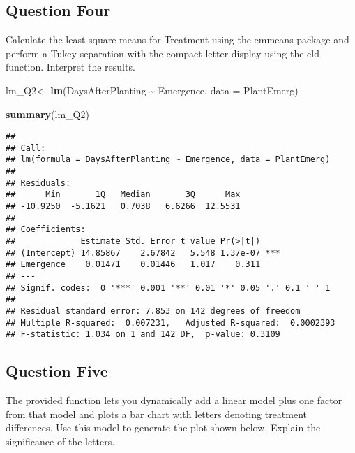 \documentclass[
  12pt,
]{article}
\newenvironment{Shaded}{\begin{snugshade}}{\end{snugshade}}
\newcommand{\AttributeTok}[1]{\textcolor[rgb]{0.13,0.29,0.53}{#1}}
\newcommand{\FunctionTok}[1]{\textcolor[rgb]{0.13,0.29,0.53}{\textbf{#1}}}
\newcommand{\NormalTok}[1]{#1}
\newcommand{\OtherTok}[1]{\textcolor[rgb]{0.56,0.35,0.01}{#1}}
\newcommand{\SpecialCharTok}[1]{\textcolor[rgb]{0.81,0.36,0.00}{\textbf{#1}}}
\begin{document}
\subsection{Question Four}\label{question-four}

Calculate the least square means for Treatment using the emmeans package
and perform a Tukey separation with the compact letter display using the
cld function. Interpret the results.

\begin{Shaded}
\begin{Highlighting}[]
\NormalTok{lm\_Q2}\OtherTok{\textless{}{-}} \FunctionTok{lm}\NormalTok{(DaysAfterPlanting }\SpecialCharTok{\textasciitilde{}}\NormalTok{ Emergence, }\AttributeTok{data =}\NormalTok{ PlantEmerg)}

\FunctionTok{summary}\NormalTok{(lm\_Q2)}
\end{Highlighting}
\end{Shaded}

\begin{verbatim}
## 
## Call:
## lm(formula = DaysAfterPlanting ~ Emergence, data = PlantEmerg)
## 
## Residuals:
##      Min       1Q   Median       3Q      Max 
## -10.9250  -5.1621   0.7038   6.6266  12.5531 
## 
## Coefficients:
##             Estimate Std. Error t value Pr(>|t|)    
## (Intercept) 14.85867    2.67842   5.548 1.37e-07 ***
## Emergence    0.01471    0.01446   1.017    0.311    
## ---
## Signif. codes:  0 '***' 0.001 '**' 0.01 '*' 0.05 '.' 0.1 ' ' 1
## 
## Residual standard error: 7.853 on 142 degrees of freedom
## Multiple R-squared:  0.007231,   Adjusted R-squared:  0.0002393 
## F-statistic: 1.034 on 1 and 142 DF,  p-value: 0.3109
\end{verbatim}

\subsection{Question Five}\label{question-five}

The provided function lets you dynamically add a linear model plus one
factor from that model and plots a bar chart with letters denoting
treatment differences. Use this model to generate the plot shown below.
Explain the significance of the letters.
\end{document}
